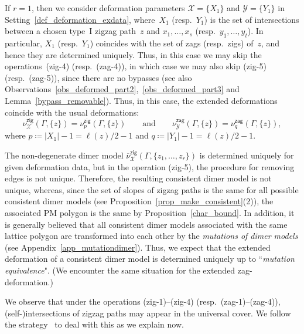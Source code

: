 \documentclass[pdftex]{sigma}%
\numberwithin{equation}{section}
\numberwithin{figure}{section}
\numberwithin{table}{section}
\newcommand{\calX}{\mathcal{X}}
\newcommand{\calY}{\mathcal{Y}}
\newcommand{\zig}{\mathsf{zig}}
\newcommand{\zag}{\mathsf{zag}}
\begin{document}
\begin{Remark}\label{r=1case}
If $r=1$, then we consider deformation parameters $\calX=\{X_1\}$ and $\calY=\{Y_1\}$ in Setting~\ref{def_deformation_exdata},
where~$X_1$ (resp.~$Y_1$) is the set of intersections between a chosen type~I zigzag path~$z$ and $x_1,\dots,x_s$ (resp.\ $y_1,\dots,y_t$).
In particular, $X_1$ (resp.~$Y_1$) coincides with the set of zags (resp.~zigs) of~$z$, and hence they are determined uniquely.
Thus, in this case we may skip the operations~(zig-4) (resp.~(zag-4)), in which case we may also skip (zig-5) (resp.~(zag-5)), since there are no bypasses
(see also Observations~\ref{obs_deformed_part2},~\ref{obs_deformed_part3} and Lemma~\ref{bypass_removable}).
Thus, in this case, the extended deformations coincide with the usual deformations:
\begin{displaymath}
\nu_\calX^\zig(\Gamma,\{z\})=\nu_p^\zig(\Gamma,\{z\})\qquad \text{and} \qquad
\nu_\calY^\zag(\Gamma,\{z\})=\nu_q^\zag(\Gamma,\{z\}),
\end{displaymath}
where $p\coloneqq |X_1|-1=\ell(z)/2-1$ and $q\coloneqq |Y_1|-1=\ell(z)/2-1$.
\end{Remark}

\begin{Remark}\label{rem_def_deform_not_unique}
The non-degenerate dimer model $\overline{\nu}^\zig_\calX(\Gamma, \{z_1,\dots,z_r\})$ is determined uniquely for given deformation data, but in the operation (zig-5), the procedure for removing edges is not unique.
Therefore, the resulting consistent dimer model is not unique, whereas, since the set of slopes of zigzag paths is the same for all possible consistent dimer models (see Proposition~\ref{prop_make_consistent}(2)), the associated PM polygon is the same by Proposition~\ref{char_bound}.
In addition, it is generally believed that all consistent dimer models associated with the same lattice polygon are transformed into each other by the \emph{mutations of dimer models} (see Appendix~\ref{app_mutationdimer}).
Thus, we expect that the extended deformation of a consistent dimer model is determined uniquely up to ``\emph{mutation equivalence}".
(We encounter the same situation for the extended zag-deformation.)
\end{Remark}

We observe that under the operations (zig-1)--(zig-4) (resp.~(zag-1)--(zag-4)), (self-)in\-ter\-sec\-tions of zigzag paths may appear in the universal cover.
We follow the strategy~\cite{BIU} to deal with this as we explain now.
\end{document}
